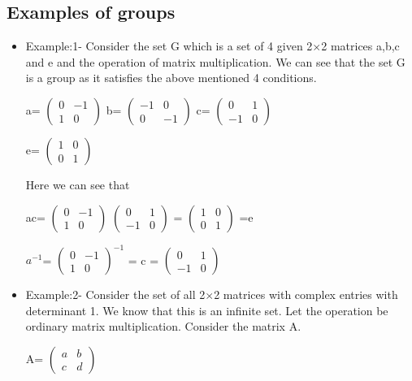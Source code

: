 \subsection{Examples of groups}
\begin{itemize}
    \item Example:1- Consider the set G which is a set of 4 given 2$\times$2 matrices a,b,c and e and the operation of matrix multiplication. We can see that the set G is a group as it satisfies the above mentioned 4 conditions.
    \begin{center}
    a=
    $\begin{pmatrix}
    0 & -1 \\
    1 & 0 
    \end{pmatrix}$
      b=
     $\begin{pmatrix}
    -1 & 0 \\
    0 & -1 
    \end{pmatrix}$
    c=
    $\begin{pmatrix}
    0 & 1 \\
    -1 & 0 
    \end{pmatrix}$
    
    e=
    $\begin{pmatrix}
    1 & 0 \\
    0 & 1 
    \end{pmatrix}$
    
    Here we can see that
    
    ac=
    $\begin{pmatrix}
    0 & -1 \\
    1 & 0 
    \end{pmatrix}$
    $\begin{pmatrix}
    0 & 1 \\
    -1 & 0 
    \end{pmatrix}$
    =
    $\begin{pmatrix}
    1 & 0 \\
    0 & 1 
    \end{pmatrix}$
    =e
    
    $a^{-1}$=
    $\begin{pmatrix}
    0 & -1 \\
    1 & 0 
    \end{pmatrix}^{-1}$
    =
    c
    =
    $\begin{pmatrix}
    0 & 1 \\
    -1 & 0 
    \end{pmatrix}$
    \end{center}
    \item Example:2- Consider the set of all 2$\times$2 matrices with complex entries with determinant 1. We know that this is an infinite set. Let the operation be ordinary matrix multiplication. Consider the matrix A.
    \begin{center}
      A=
    $\begin{pmatrix}
    a & b \\
    c & d 
    \end{pmatrix}$  
    \end{center}
    

\end{itemize}
